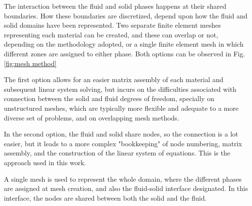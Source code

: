 \documentclass{article}
\begin{document}
The interaction between the fluid and solid phases happens at their shared boundaries. How these boundaries are discretized, depend upon how the fluid and solid domains have been represented. Two separate finite element meshes representing each material can be created, and these can overlap or not, depending on the methodology adopted, or a single finite element mesh in which different zones are assigned to either phase. Both options can be observed in Fig. \ref{fig:mesh method}


The first option allows for an easier matrix assembly of each material and subsequent linear system solving, but incurs on the difficulties associated with connection between the solid and fluid degrees of freedom, specially on unstructured meshes, which are typically more flexible and adequate to a more diverse set of problems, and on overlapping mesh methods.

In the second option, the fluid and solid share nodes, so the connection is a lot easier, but it leads to a more complex "bookkeeping" of node numbering, matrix assembly, and the construction of the linear system of equations. This is the approach used in this work.

A single mesh is used to represent the whole domain, where the different phases are assigned at mesh creation, and also the fluid-solid interface designated. In this interface, the nodes are shared between both the solid and the fluid.
\end{document}
